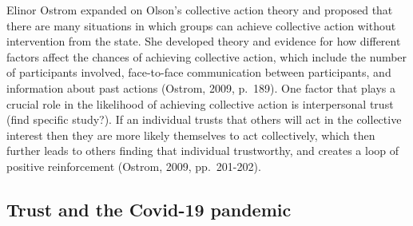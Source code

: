 \documentclass[
  11pt,
]{article}
\begin{document}
Elinor Ostrom expanded on Olson's collective action theory and proposed that there are many situations in which groups can achieve collective action without intervention from the state. She developed theory and evidence for how different factors affect the chances of achieving collective action, which include the number of participants involved, face-to-face communication between participants, and information about past actions (Ostrom, 2009, p.~189). One factor that plays a crucial role in the likelihood of achieving collective action is interpersonal trust (find specific study?). If an individual trusts that others will act in the collective interest then they are more likely themselves to act collectively, which then further leads to others finding that individual trustworthy, and creates a loop of positive reinforcement (Ostrom, 2009, pp.~201-202).\\

\hypertarget{trust-and-the-covid-19-pandemic}{%
\subsection{Trust and the Covid-19 pandemic}\label{trust-and-the-covid-19-pandemic}}
\end{document}
